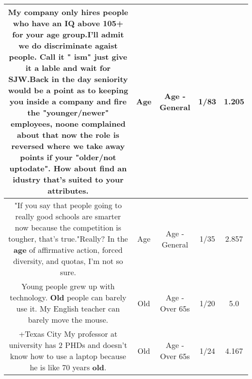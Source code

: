 \documentclass[11pt]{article}
\newlength\mylength
\begin{document}
\begin{center}
\begin{longtable}{|C{.65\mylength}|C{.30\mylength}|C{.12\mylength}|C{.12\mylength}|C{.12\mylength}|}
  \small My company only hires people who have an IQ above 105+ for your \textbf{age} group.I'll admit we do discriminate agaist people. Call it "    ism" just give it a lable and wait for SJW.Back in the day seniority would be a point as to keeping you inside a company and fire the "younger/newer" employees, noone complained about that now the role is reversed where we take away points if your "older/not uptodate". How about find an idustry that's suited to your attributes.\normalsize   & Age & Age - General & 1/83 & 1.205 \\  \hline
  \small "If you say that people going to really good schools are smarter now because the competition is tougher, that's true."Really? In the \textbf{age} of affirmative action, forced diversity, and quotas, I'm not so sure.\normalsize   & Age & Age - General & 1/35 & 2.857 \\  \hline
  \small Young people grew up with technology. \textbf{Old} people can barely use it. My English teacher can barely move the mouse.\normalsize   & Old & Age - Over 65s & 1/20 & 5.0 \\  \hline
  \small +Texas City My professor at university has 2 PHDs and doesn't know how to use a laptop because he is like 70 years \textbf{old}.\normalsize   & Old & Age - Over 65s & 1/24 & 4.167 \\  \hline

\end{longtable}
\end{center}
\end{document}
